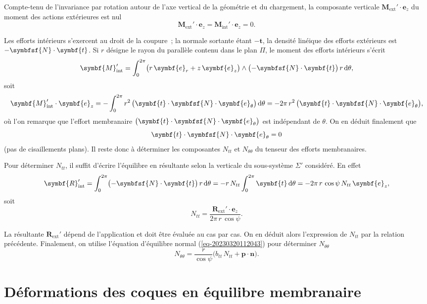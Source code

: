 \documentclass[
  a4paper,
  DIV=11,
  numbers=noendperiod]{scrreprt}
\newcommand{\D}{{\mathrm d}}
\newcommand{\external}{\mathrm{ext}}
\newcommand{\internal}{\mathrm{int}}
\newcommand{\tens}[1]{\symbfsf{#1}}
\renewcommand{\vec}[1]{\symbf{#1}}
\begin{document}
Compte-tenu de l'invariance par rotation autour de l'axe vertical de la
géométrie et du chargement, la composante verticale
\(\vec{M}_\external' \cdot \vec{e}_z\) du moment des actions extérieures
est nul \[
\vec{M}_\external' \cdot \vec{e}_z = \vec{M}_\internal' \cdot \vec{e}_z = 0.
\]

Les efforts intérieurs s'exercent au droit de la coupure~; la normale
sortante étant \(-\vec{t}\), la densité linéique des efforts extérieurs
est \(-\tens{N} \cdot \vec{t}\). Si \(r\) désigne le rayon du parallèle
contenu dans le plan \(\Pi\), le moment des efforts intérieurs s'écrit
\[
\vec{M}_\internal' = \int_0^{2\pi} \bigl(r \, \vec{e}_r + z \, \vec{e}_z \bigr) \wedge \bigl( -\tens{N} \cdot \vec{t} \bigr) \, r \, \D \theta,
\] soit \[
\vec{M}_\internal' \cdot \vec{e}_z = -\int_0^{2\pi} r^2 \, \bigl( \vec{t} \cdot \tens{N} \cdot \vec{e}_\theta \bigr) \, \D \theta = -2\pi \, r^2 \, \bigl( \vec{t} \cdot \tens{N} \cdot \vec{e}_\theta \bigr),
\] où l'on remarque que l'effort membranaire
\(\bigl( \vec{t} \cdot \tens{N} \cdot \vec{e}_\theta \bigr)\) est
indépendant de \(\theta\). On en déduit finalement que \[
\vec{t} \cdot \tens{N} \cdot \vec{e}_\theta = 0
\] (pas de cisaillements plans). Il reste donc à déterminer les
composantes \(N_{tt}\) et \(N_{\theta\theta}\) du tenseur des efforts
membranaires.

Pour déterminer \(N_{tt}\), il suffit d'écrire l'équilibre en résultante
selon la verticale du sous-système \(\Sigma'\) considéré. En effet \[
\vec{R}_\internal' = \int_{0}^{2\pi} \bigl( -\tens{N} \cdot \vec{t} \bigr) \, r \, \D \theta = -r \, N_{tt} \int_{0}^{2\pi} \vec{t} \, \D \theta = -2\pi \, r \, \cos \psi \, N_{tt} \, \vec{e}_z,
\] soit \[
N_{tt} = \frac{\vec{R}_\external' \cdot \vec{e}_z}{2\pi \, r \, \cos \psi}.
\]

La résultante \(\vec{R}_\external'\) dépend de l'application et doit
être évaluée au cas par cas. On en déduit alors l'expression de
\(N_{tt}\) par la relation précédente. Finalement, on utilise l'équation
d'équilibre normal (\ref{eq-20230320112043}) pour déterminer
\(N_{\theta\theta}\) \[
N_{\theta\theta} = \frac{r}{\cos \psi} \bigl( b_{tt} \, N_{tt} + \vec{p} \cdot \vec{n} \bigr).
\]

\hypertarget{duxe9formations-des-coques-en-uxe9quilibre-membranaire}{%
\section{Déformations des coques en équilibre
membranaire}\label{duxe9formations-des-coques-en-uxe9quilibre-membranaire}}
\end{document}
